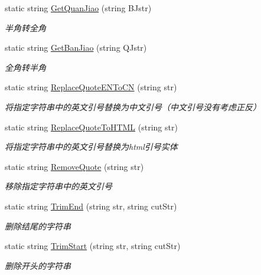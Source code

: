\begin{DoxyCompactItemize}
static string \hyperlink{class_x_c_l_net_tools_1_1_string_hander_1_1_common_ac4c5c91417fc48267b8c2600bb857dca}{Get\-Quan\-Jiao} (string B\-Jstr)
\begin{DoxyCompactList}\small\item\em 半角转全角 \end{DoxyCompactList}\item 
static string \hyperlink{class_x_c_l_net_tools_1_1_string_hander_1_1_common_a2951e9d8596697ebd7b2f454d9253d91}{Get\-Ban\-Jiao} (string Q\-Jstr)
\begin{DoxyCompactList}\small\item\em 全角转半角 \end{DoxyCompactList}\item 
static string \hyperlink{class_x_c_l_net_tools_1_1_string_hander_1_1_common_af1c235bbfc59dedcaeb0731301226c3b}{Replace\-Quote\-E\-N\-To\-C\-N} (string str)
\begin{DoxyCompactList}\small\item\em 将指定字符串中的英文引号替换为中文引号（中文引号没有考虑正反） \end{DoxyCompactList}\item 
static string \hyperlink{class_x_c_l_net_tools_1_1_string_hander_1_1_common_adecc464f722d6bc0e3ab9ba42277d730}{Replace\-Quote\-To\-H\-T\-M\-L} (string str)
\begin{DoxyCompactList}\small\item\em 将指定字符串中的英文引号替换为html引号实体 \end{DoxyCompactList}\item 
static string \hyperlink{class_x_c_l_net_tools_1_1_string_hander_1_1_common_a7ac48e68f1f3943c8e8425df41aa52ca}{Remove\-Quote} (string str)
\begin{DoxyCompactList}\small\item\em 移除指定字符串中的英文引号 \end{DoxyCompactList}\item 
static string \hyperlink{class_x_c_l_net_tools_1_1_string_hander_1_1_common_a3ed633ff7c9b12a2d63ebe9eb8fd7dd2}{Trim\-End} (string str, string cut\-Str)
\begin{DoxyCompactList}\small\item\em 删除结尾的字符串 \end{DoxyCompactList}\item 
static string \hyperlink{class_x_c_l_net_tools_1_1_string_hander_1_1_common_afcc9efd028a6a7937e8f75307e78b54c}{Trim\-Start} (string str, string cut\-Str)
\begin{DoxyCompactList}\small\item\em 删除开头的字符串 \end{DoxyCompactList}\item 

\end{DoxyCompactItemize}

